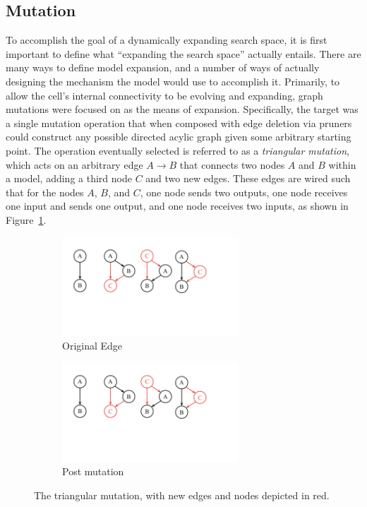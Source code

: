 \subsection{Mutation}
To accomplish the goal of a dynamically expanding search space, it is first important to define what ``expanding the search space''
actually entails. There are many ways
to define model expansion, and a number of ways of actually designing the mechanism the model would use to accomplish
it. Primarily, to allow the cell's internal connectivity to be evolving and expanding, graph mutations were focused on as the means of expansion.
Specifically, the target was a single mutation operation that when
composed with edge deletion via pruners could construct any possible directed acylic graph given some arbitrary starting point.
The operation eventually selected is referred to as a \textit{triangular mutation}, which acts on an arbitrary edge $A\rightarrow B$ that
connects two nodes $A$ and $B$ within a model, adding a third node $C$ and two new edges. These edges are wired such that
for the nodes $A$, $B$, and $C$, one node sends two outputs, one node receives one input and sends one output,
and one node receives two inputs, as shown in Figure~\ref{fig:mutation patterns}.

\begin{figure}[ht!]
\centering
\begin{subfigure}{.43\textwidth}
  \centering
  \includegraphics[height=10em]{ab}
  \caption{Original Edge}
\end{subfigure}
\begin{subfigure}{.45\textwidth}
  \centering
  \includegraphics[height=10em]{ab3}
  \caption{Post mutation}
\end{subfigure}%
\caption[The triangular mutation]{The triangular mutation, with new edges and nodes depicted in red.}
\label{fig:mutation patterns}
\end{figure}

